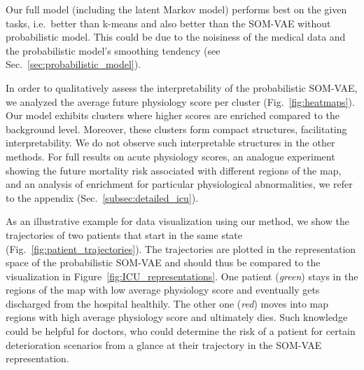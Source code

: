 Our full model (including the latent Markov model) performs best on the given tasks, i.e.\ better than k-means and also better than the SOM-VAE without probabilistic model.
This could be due to the noisiness of the medical data and the probabilistic model's smoothing tendency (see Sec.~\ref{sec:probabilistic_model}).

In order to qualitatively assess the interpretability of the probabilistic SOM-VAE, we analyzed the average future physiology score per cluster (Fig.~\ref{fig:heatmaps}).
Our model exhibits clusters where higher scores are enriched compared to the background level.
Moreover, these clusters form compact structures, facilitating interpretability.
We do not observe such interpretable structures in the other methods. For full results on acute physiology scores, an analogue experiment showing the 
future mortality risk associated with different regions of the map, and an analysis of enrichment for
particular physiological abnormalities, we refer to the appendix (Sec.\ \ref{subsec:detailed_icu}). 

As an illustrative example for data visualization using our method, we show the trajectories of two patients that start in the same state (Fig.~\ref{fig:patient_trajectories}).
The trajectories are plotted in the representation space of the probabilistic SOM-VAE and should thus be compared to the visualization in Figure~\ref{fig:ICU_representations}.
One patient (\emph{green}) stays in the regions of the map with low average physiology score and eventually gets discharged from the hospital healthily.
The other one (\emph{red}) moves into map regions with high average physiology score and ultimately dies.
Such knowledge could be helpful for doctors, who could determine the risk of a patient for certain deterioration scenarios from a glance at their trajectory in the SOM-VAE representation.

